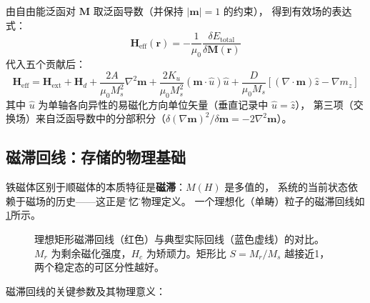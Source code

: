 \documentclass[11pt,a4paper,twoside]{article}
\theoremstyle{definition}
\theoremstyle{plain}
\theoremstyle{remark}
\begin{document}
由自由能泛函对 $\mathbf{M}$ 取泛函导数（并保持 $|\mathbf{m}| = 1$ 的约束），
得到有效场的表达式：
\begin{equation}
  \mathbf{H}_{\text{eff}}(\mathbf{r}) = -\frac{1}{\mu_0}\frac{\delta E_{\text{total}}}{\delta \mathbf{M}(\mathbf{r})}
\end{equation}
代入五个贡献后：
\begin{equation}\label{eq:heff-full}
  \boxed{
  \mathbf{H}_{\text{eff}} = \mathbf{H}_{\text{ext}} + \mathbf{H}_d
  + \frac{2A}{\mu_0 M_s^2} \nabla^2 \mathbf{m}
  + \frac{2K_u}{\mu_0 M_s^2} (\mathbf{m} \cdot \hat{u}) \hat{u}
  + \frac{D}{\mu_0 M_s} \left[ (\nabla \cdot \mathbf{m})\hat{z} - \nabla m_z \right]
  }
\end{equation}
其中 $\hat{u}$ 为单轴各向异性的易磁化方向单位矢量（垂直记录中 $\hat{u} = \hat{z}$），
第三项（交换场）来自泛函导数中的分部积分（$\delta(\nabla\mathbf{m})^2/\delta\mathbf{m} = -2\nabla^2\mathbf{m}$）。

\subsection{磁滞回线：存储的物理基础}

铁磁体区别于顺磁体的本质特征是\textbf{磁滞}：$M(H)$ 是多值的，
系统的当前状态依赖于磁场的历史——这正是\"记忆\"的物理定义。
一个理想化（单畴）粒子的磁滞回线如\cref{fig:hysteresis}所示。

\begin{figure}[H]
\centering
{}
\caption{理想矩形磁滞回线（红色）与典型实际回线（蓝色虚线）的对比。
$M_r$ 为剩余磁化强度，$H_c$ 为矫顽力。矩形比 $S = M_r/M_s$ 越接近1，
两个稳定态的可区分性越好。}
\label{fig:hysteresis}
\end{figure}

磁滞回线的关键参数及其物理意义：
\end{document}
